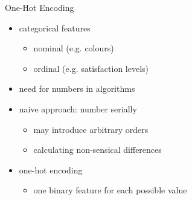\begin{frame}[t]{One-Hot Encoding}
	\begin{itemize}
		\item
		categorical features
		\begin{itemize}
			\item
			nominal (e.g. colours)
			
			\item
			ordinal (e.g. satisfaction levels)
		\end{itemize}
	
		\item
		need for numbers in algorithms
	
		\item
		naive approach: number serially
		\begin{itemize}
			\item
			may introduce arbitrary orders
			
			\item
			calculating non-sensical differences
		\end{itemize}
	
		\item
		one-hot encoding
		\begin{itemize}
			\item
			one binary feature for each possible value
		\end{itemize}
	\end{itemize}
\end{frame}